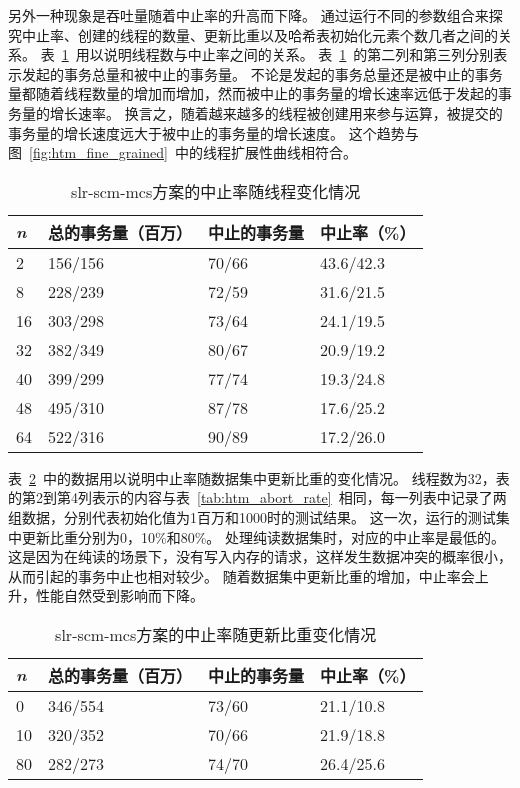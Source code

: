 另外一种现象是吞吐量随着中止率的升高而下降。
通过运行不同的参数组合来探究中止率、创建的线程的数量、更新比重以及哈希表初始化元素个数几者之间的关系。
表~\ref{tab:abort_rate_thread}~用以说明线程数与中止率之间的关系。
表~\ref{tab:abort_rate_thread}~的第二列和第三列分别表示发起的事务总量和被中止的事务量。
不论是发起的事务总量还是被中止的事务量都随着线程数量的增加而增加，然而被中止的事务量的增长速率远低于发起的事务量的增长速率。
换言之，随着越来越多的线程被创建用来参与运算，被提交的事务量的增长速度远大于被中止的事务量的增长速度。
这个趋势与图~\ref{fig:htm_fine_grained}~中的线程扩展性曲线相符合。

\begin{table}[htbp]
  \centering
  \caption{slr-scm-mcs方案的中止率随线程变化情况}
  \label{tab:abort_rate_thread}
  \begin{tabular}{llll}
    \toprule
      \textit{n}  & 总的事务量（百万） & 中止的事务量 & 中止率（\%） \\
    \midrule
      2   & 156/156 & 70/66 & 43.6/42.3  \\
      8   & 228/239 & 72/59 & 31.6/21.5 \\
      16  & 303/298 & 73/64 & 24.1/19.5  \\
      32  & 382/349 & 80/67 & 20.9/19.2  \\
      40  & 399/299 & 77/74 & 19.3/24.8 \\
      48  & 495/310 & 87/78 & 17.6/25.2  \\
      64  & 522/316 & 90/89 & 17.2/26.0 \\
    \bottomrule
  \end{tabular}
\end{table}

表~\ref{tab:htm_update}~中的数据用以说明中止率随数据集中更新比重的变化情况。
线程数为32，表的第2到第4列表示的内容与表~\ref{tab:htm_abort_rate}~相同，每一列表中记录了两组数据，分别代表初始化值为1百万和1000时的测试结果。
这一次，运行的测试集中更新比重分别为0，10\%和80\%。
处理纯读数据集时，对应的中止率是最低的。
这是因为在纯读的场景下，没有写入内存的请求，这样发生数据冲突的概率很小，从而引起的事务中止也相对较少。
随着数据集中更新比重的增加，中止率会上升，性能自然受到影响而下降。

\begin{table}[htbp]
  \centering
  \caption{slr-scm-mcs方案的中止率随更新比重变化情况}
  \label{tab:htm_update}
  \begin{tabular}{llll}
    \toprule
      \textit{n}  & 总的事务量（百万） & 中止的事务量 & 中止率（\%） \\
    \midrule
      0   &  346/554 & 73/60 & 21.1/10.8  \\
      10  &  320/352 & 70/66 & 21.9/18.8 \\
      80  &  282/273 & 74/70 & 26.4/25.6  \\
    \bottomrule
  \end{tabular}
\end{table}

